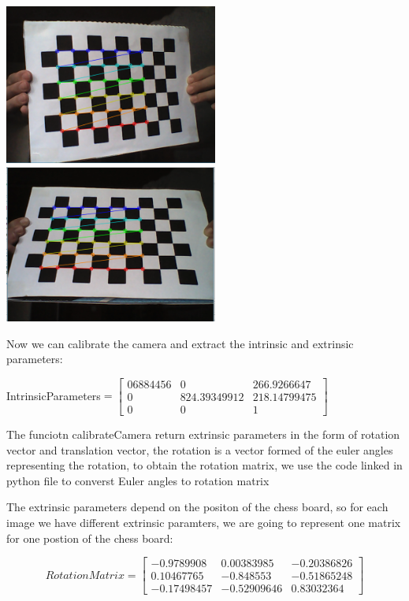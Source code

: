 \documentclass[12pt,a4paper]{report}
\begin{document}
\begin{center}
\includegraphics[width=7cm]{Capture7.png}
\includegraphics[width=7cm]{Capture8.png}
\end{center}

Now we can calibrate the camera and extract the intrinsic and extrinsic parameters:

IntrinsicParameters$  =\left[\begin{array}{ccc}  06884456 &  0   &      266.9266647 \\
   0     &    824.39349912 & 218.14799475 \\
   0    &       0   &        1        \end{array}\right]$

The funciotn calibrateCamera return extrinsic parameters in the form of rotation vector and translation vector, the rotation is a  vector formed of the euler angles representing the rotation, to obtain the rotation matrix, we use the code linked in python file to converst Euler angles to rotation matrix

The extrinsic parameters depend on the positon of the chess board, so for each image we have different extrinsic paramters, we are going to represent one matrix for one postion of the chess board:
 
 
$$Rotation Matrix  =\left[\begin{array}{ccc} -0.9789908 &  0.00383985 & -0.20386826\\
        0.10467765& -0.848553  & -0.51865248\\
       -0.17498457 &-0.52909646 & 0.83032364 \end{array}\right]$$
\end{document}
